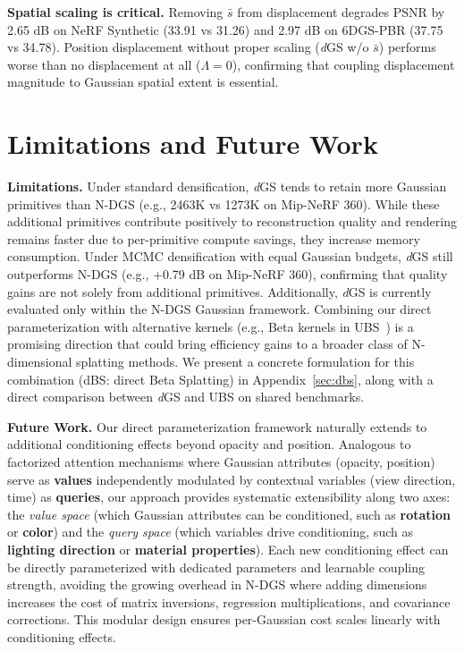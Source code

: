 \documentclass{article}
\newcommand{\modelname}{\textit{d}GS}
\theoremstyle{plain}
\theoremstyle{definition}
\theoremstyle{remark}
\begin{document}
\textbf{Spatial scaling is critical.} Removing $\bar{s}$ from displacement degrades PSNR by 2.65 dB on NeRF Synthetic (33.91 vs 31.26) and 2.97 dB on 6DGS-PBR (37.75 vs 34.78). Position displacement without proper scaling (\textit{d}GS w/o $\bar{s}$) performs worse than no displacement at all ($\Lambda{=}0$), confirming that coupling displacement magnitude to Gaussian spatial extent is essential.

\section{Limitations and Future Work}

\textbf{Limitations.} Under standard densification, \modelname{} tends to retain more Gaussian primitives than N-DGS (e.g., 2463K vs 1273K on Mip-NeRF 360). While these additional primitives contribute positively to reconstruction quality and rendering remains faster due to per-primitive compute savings, they increase memory consumption. Under MCMC densification with equal Gaussian budgets, \modelname{} still outperforms N-DGS (e.g., +0.79 dB on Mip-NeRF 360), confirming that quality gains are not solely from additional primitives. Additionally, \modelname{} is currently evaluated only within the N-DGS Gaussian framework. Combining our direct parameterization with alternative kernels (e.g., Beta kernels in UBS~\citep{liu2025universal}) is a promising direction that could bring efficiency gains to a broader class of N-dimensional splatting methods. We present a concrete formulation for this combination (dBS: direct Beta Splatting) in Appendix~\ref{sec:dbs}, along with a direct comparison between \modelname{} and UBS on shared benchmarks.

\textbf{Future Work.} Our direct parameterization framework naturally extends to additional conditioning effects beyond opacity and position. Analogous to factorized attention mechanisms where Gaussian attributes (opacity, position) serve as \textbf{values} independently modulated by contextual variables (view direction, time) as \textbf{queries}, our approach provides systematic extensibility along two axes: the \textit{value space} (which Gaussian attributes can be conditioned, such as \textbf{rotation} or \textbf{color}) and the \textit{query space} (which variables drive conditioning, such as \textbf{lighting direction} or \textbf{material properties}). Each new conditioning effect can be directly parameterized with dedicated parameters and learnable coupling strength, avoiding the growing overhead in N-DGS where adding dimensions increases the cost of matrix inversions, regression multiplications, and covariance corrections. This modular design ensures per-Gaussian cost scales linearly with conditioning effects.
\end{document}
